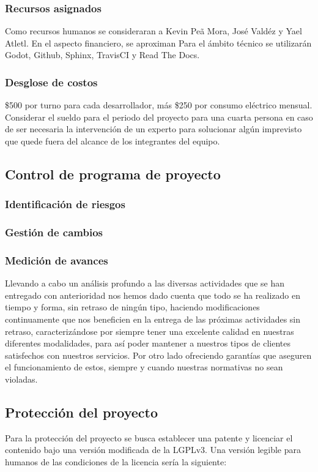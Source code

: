 \documentclass[]{article}
\begin{document}
\subsubsection{Recursos asignados}
Como recursos humanos se consideraran a Kevin Pe\~a Mora, Jos\'e Vald\'ez y Yael Atletl. En el aspecto financiero, se aproximan 
Para el \'ambito t\'ecnico se utilizar\'an Godot, Github, Sphinx, TravisCI y Read The Docs.

\subsubsection{Desglose de costos}
\$500 por turno para cada desarrollador, m\'as \$250 por consumo el\'ectrico mensual. 
Considerar el sueldo para el periodo del proyecto para una cuarta persona en caso de ser necesaria la intervenci\'on de un experto para solucionar alg\'un imprevisto que quede fuera del alcance de los integrantes del equipo.

\subsection{Control de programa de proyecto} %
\subsubsection{Identificaci\'on de riesgos}

\subsubsection{Gesti\'on de cambios}
\subsubsection{Medici\'on de avances}

Llevando a cabo un an\'alisis profundo a las diversas actividades que se han entregado con anterioridad nos hemos dado cuenta que todo se ha realizado en tiempo y forma, sin retraso de ning\'un tipo, haciendo modificaciones continuamente que nos beneficien en la entrega de las próximas actividades sin retraso, caracterizándose por siempre tener una excelente calidad en nuestras diferentes modalidades, para así poder mantener a nuestros tipos de clientes satisfechos con nuestros servicios. 
Por otro lado ofreciendo garantías que aseguren el funcionamiento de estos, siempre y cuando nuestras normativas no sean violadas. 


\subsection{Protecci\'on del proyecto}
Para la protecci\'on del proyecto se busca establecer una patente y licenciar el contenido bajo una versi\'on modificada de la LGPLv3. Una versi\'on legible para humanos de las condiciones de la licencia ser\'ia la siguiente: 
\newline
\end{document}
